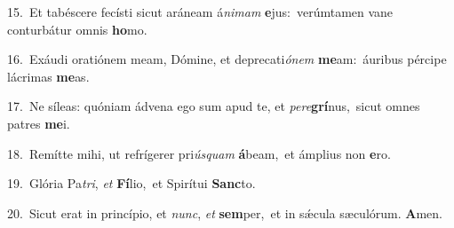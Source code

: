 {\numbfont\textcolor{\numbcolor}{15.}}~Et tabéscere fecísti sicut aráneam á\-\textit{ni}\-\textit{mam} \textbf{e}\-jus:~\star verúmtamen vane conturbátur omnis \textbf{ho}\-mo.\par
{\numbfont\textcolor{\numbcolor}{16.}}~Exáudi oratiónem meam, Dómine, et deprecati\-\textit{ó}\-\textit{nem} \textbf{me}\-am:~\star áuribus pércipe lácrimas \textbf{me}\-as.\par
{\numbfont\textcolor{\numbcolor}{17.}}~Ne síleas: quóniam ádvena ego sum apud te, et \textit{per}\-\textit{e}\textbf{grí}nus,~\star sicut omnes patres \textbf{me}\-i.\par
{\numbfont\textcolor{\numbcolor}{18.}}~Remítte mihi, ut refrígerer pri\-\textit{ús}\-\textit{quam} \textbf{á}\-beam,~\star et ámplius non \textbf{e}\-ro.\par
{\numbfont\textcolor{\numbcolor}{19.}}~Glória Pa\-\textit{tri}\-, \textit{et} \textbf{Fí}\-lio,~\star et Spirítui \textbf{Sanc}\-to.\par
{\numbfont\textcolor{\numbcolor}{20.}}~Sicut erat in princípio, et \textit{nunc}\-, \textit{et} \textbf{sem}\-per,~\star et in sǽcula sæculórum. \textbf{A}\-men.\par
